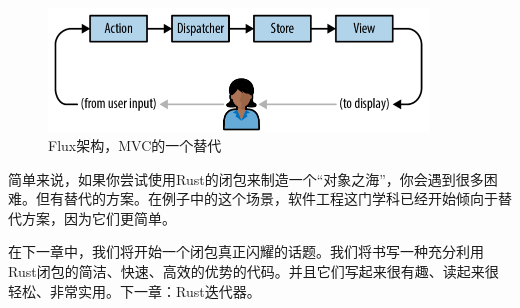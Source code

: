 \begin{figure}[htbp]
    \centering
    \includegraphics[width=0.9\textwidth]{../img/f14-4.png}
    \caption{Flux架构，MVC的一个替代}
    \label{f14-4}
\end{figure}

简单来说，如果你尝试使用Rust的闭包来制造一个“对象之海”，你会遇到很多困难。但有替代的方案。在例子中的这个场景，软件工程这门学科已经开始倾向于替代方案，因为它们更简单。

在下一章中，我们将开始一个闭包真正闪耀的话题。我们将书写一种充分利用Rust闭包的简洁、快速、高效的优势的代码。并且它们写起来很有趣、读起来很轻松、非常实用。下一章：Rust迭代器。
